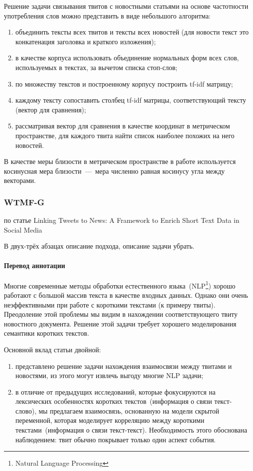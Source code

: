         Решение задачи связывания твитов с новостными статьями на основе частотности употребления слов можно представить в виде небольшого алгоритма:
        \begin{enumerate}
            \item объединить тексты всех твитов и тексты всех новостей (для новости текст это конкатенация заголовка и краткого изложения);
            \item в качестве корпуса использовать объединение нормальных форм всех слов, используемых в текстах, за вычетом списка стоп-слов;
            \item по множеству текстов и построенному корпусу построить tf-idf матрицу;
            \item каждому тексту сопоставить столбец tf-idf матрицы, соответствующий тексту (вектор для сравнения);
            \item рассматривая вектор для сравнения в качестве координат в метрическом пространстве, для каждого твита найти список наиболее похожих на него новостей.
        \end{enumerate}

        В качестве меры близости в метрическом пространстве в работе используется косинусная мера близости~---~мера численно равная косинусу угла между векторами.

    \subsubsection{WTMF-G}
        по статье Linking Tweets to News: A Framework to Enrich Short Text Data in Social Media

        В двух-трёх абзацах описание подхода, описание задачи убрать.

        \paragraph{Перевод аннотации}
            Многие современные методы обработки естественного языка~(NLP\footnote{Natural Language Processing}) хорошо работают с большой массив текста в качестве входных данных.
            Однако они очень неэффективными при работе с короткими текстами (к примеру твиты).
            Преодоление этой проблемы мы видим в нахождении соответствующего твиту новостного документа.
            Решение этой задачи требует хорошего моделирования семантики коротких текстов.

            Основной вклад статьи двойной:
            \begin{enumerate}
                \item представлено решение задачи нахождения взаимосвязи между твитами и новостями, из этого могут извлечь выгоду многие NLP задачи;
                \item в отличие от предыдущих исследований, которые фокусируются на лексических особенностях коротких текстов~(информация о связи текст-слово), мы предлагаем взаимосвязь, основанную на модели скрытой переменной, которая моделирует корреляцию между короткими текстами~(информация о связи текст-текст). Необходимость этого обоснована наблюдением: твит обычно покрывает только один аспект события.
            \end{enumerate}

